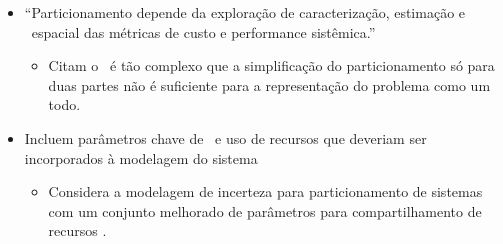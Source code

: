    \begin{frame}{\cite{Wang2016}} \vspace{-1em}
      \begin{itemize}
         \setlength{\itemsep}{1.7em}
         \item ``Particionamento depende da exploração de caracterização, estimação e \design\ espacial das métricas de custo e performance sistêmica.''
         \begin{itemize}
            \item Citam o \codesign\ é tão complexo que a simplificação do particionamento só para duas partes não é suficiente para a representação do problema como um todo. 
         \end{itemize}
         
         \item Incluem parâmetros chave de \design\ e uso de recursos que deveriam ser incorporados à modelagem do sistema
         \begin{itemize}
            \item Considera a modelagem de incerteza para particionamento de sistemas com um conjunto melhorado de parâmetros para compartilhamento de recursos \hs.
         \end{itemize}
      
      \end{itemize}
   \end{frame}
   
